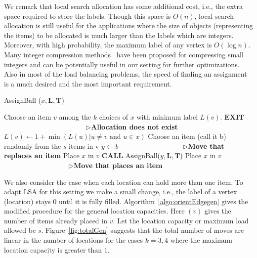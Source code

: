 We remark that local search allocation has some additional cost, i.e., the extra space required to store the labels. Though this space is $O(n)$, local search allocation is still useful for the applications where the size of objects (representing the items) to be allocated is much larger than the labels which are integers. Moreover, with high probability, the maximum label of any vertex is $O(\log n)$. Many integer compression methods~\cite{inp:sgl10} have been proposed for compressing small integers and can be potentially useful in our setting for further optimizations. Also in most of the load balancing problems, the speed of finding an assignment is a much desired and the most important requirement.
\begin{algorithm}[h!]
\caption{AssignBall ($x, \mathbf{L},\mathbf{T}$)}
\label{algo:orientEdgegen}
\begin{algorithmic}[1]
\STATE Choose an item $v$ among the $k$ choices of $x$ with minimum label $L(v)$.
\STATE $\mathbf{EXIT}$  ~~~~~~~~~~~~~~~~~~~~~~~ $\rhd${\textbf{Allocation does not exist}}
\ELSE
{}
\STATE $L(v) \leftarrow 1+ \min{(L(u)| u \neq v \text{~and $u \in x$})}$
\ENDIF
{}
\STATE Choose an item (call it b) randomly from the $s$ items in v
\STATE $y\leftarrow b$~~~~~~~~~~~~~~~~~~ $\rhd${\textbf{Move that replaces an item}}
\STATE Place $x$ in $v$
\STATE $\mathbf{CALL}$ {AssignBall($y, \mathbf{L},\mathbf{T}$)}
\ELSE  
\STATE Place $x$ in $v$ ~~~~~~~~~~~~~~~~~~ $\rhd${\textbf{Move that places an item}}
\ENDIF
\ENDIF
\end{algorithmic}
\end{algorithm}
We also consider the case when each location can hold more than one item. To adapt LSA for this setting we make a small change, i.e., the label of a vertex (location) stays 0 until it is fully filled. Algorithm~\ref{algo:orientEdgegen} gives the modified procedure for the general location capacities. Here {}$(v)$ gives the number of items already placed in $v$. Let the location capacity or maximum load allowed be $s$. Figure~\ref{fig:totalGen} suggests that the total number of moves are linear in the number of locations for the cases $k=3,4$ where the maximum location capacity is greater than $1$.


